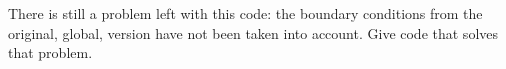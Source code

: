   There is still a problem left with this code: the boundary
  conditions from the original, global, version have not been taken
  into account. Give code that solves that problem.
